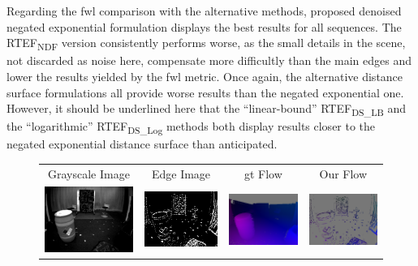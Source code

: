 Regarding the \acrshort{fwl} comparison with the alternative methods, proposed denoised negated exponential formulation displays the best results for all sequences. The RTEF\textsubscript{NDF} version consistently performs worse, as the small details in the scene, not discarded as noise here, compensate more difficultly than the main edges and lower the results yielded by the \acrshort{fwl} metric. Once again, the alternative distance surface formulations all provide worse results than the negated exponential one. However, it should be underlined here that the ``linear-bound'' RTEF\textsubscript{DS\_LB} and the ``logarithmic'' RTEF\textsubscript{DS\_Log} methods both display results closer to the negated exponential distance surface than anticipated.

\begin{figure}
  \centering
  \setlength\tabcolsep{1pt}
  \begin{tabular}{@{}cccc@{}}
    Grayscale Image & Edge Image & \acrshort{gt} Flow & Our Flow \\
    \includegraphics[width=0.245\linewidth]{mainmatter/figures/3_optical_flow/results_mvsec/indoor_flying1_grayscale.png} &
    \includegraphics[width=0.245\linewidth]{mainmatter/figures/3_optical_flow/results_mvsec/indoor_flying1_edges.png} &
    \includegraphics[width=0.245\linewidth]{mainmatter/figures/3_optical_flow/results_mvsec/indoor_flying1_ground_truth_lightgray.png} &
    \includegraphics[width=0.245\linewidth]{mainmatter/figures/3_optical_flow/results_mvsec/indoor_flying1_our_flow_gray.png} \\

\end{tabular}
\end{figure}
